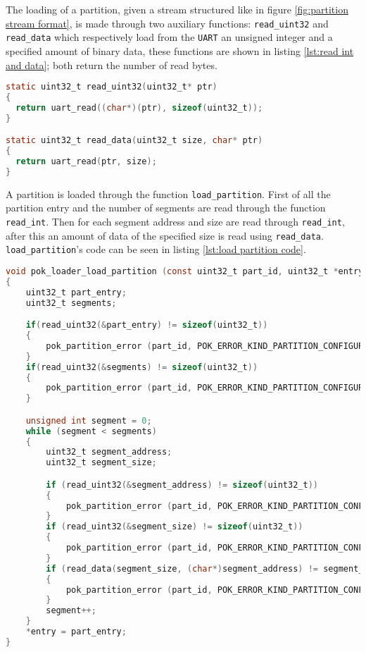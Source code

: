 The loading of a partition, given a stream structured like in figure \ref{fig:partition stream format}, is made through two auxiliary functions: \texttt{read\_uint32} and \texttt{read\_data} which respectively load from the \texttt{UART} an unsigned integer and a specified amount of binary data, these functions are shown in listing \ref{lst:read int and data}; both return the number of read bytes.

\begin{lstlisting}[language=C, caption=Function to read an integer and a variable amount of data from the \texttt{UART}, label=lst:read int and data]
static uint32_t read_uint32(uint32_t* ptr)
{
  return uart_read((char*)(ptr), sizeof(uint32_t));
}

static uint32_t read_data(uint32_t size, char* ptr)
{
  return uart_read(ptr, size);
}
\end{lstlisting}

A partition is loaded through the function \texttt{load\_partition}. First of all the partition entry and the number of segments are read through the function \texttt{read\_int}. Then for each segment address and size are read through \texttt{read\_int}, after this an amount of data of the specified size is read using \texttt{read\_data}. \texttt{load\_partition}'s code can be seen in listing \ref{lst:load partition code}.

\begin{lstlisting}[language=C, caption=\texttt{load\_partition} code, label=lst:load partition code]
void pok_loader_load_partition (const uint32_t part_id, uint32_t *entry)
{
	uint32_t part_entry;
	uint32_t segments;

	if(read_uint32(&part_entry) != sizeof(uint32_t))
	{
		pok_partition_error (part_id, POK_ERROR_KIND_PARTITION_CONFIGURATION);
	}
	if(read_uint32(&segments) != sizeof(uint32_t))
	{
		pok_partition_error (part_id, POK_ERROR_KIND_PARTITION_CONFIGURATION);
	}

	unsigned int segment = 0;
	while (segment < segments) 
	{
		uint32_t segment_address;
		uint32_t segment_size;

		if (read_uint32(&segment_address) != sizeof(uint32_t))
		{
			pok_partition_error (part_id, POK_ERROR_KIND_PARTITION_CONFIGURATION);
		}
		if (read_uint32(&segment_size) != sizeof(uint32_t))
		{
			pok_partition_error (part_id, POK_ERROR_KIND_PARTITION_CONFIGURATION);
		}
		if (read_data(segment_size, (char*)segment_address) != segment_size) 
		{
			pok_partition_error (part_id, POK_ERROR_KIND_PARTITION_CONFIGURATION);
		}
		segment++;
	}
	*entry = part_entry;
}
\end{lstlisting}

